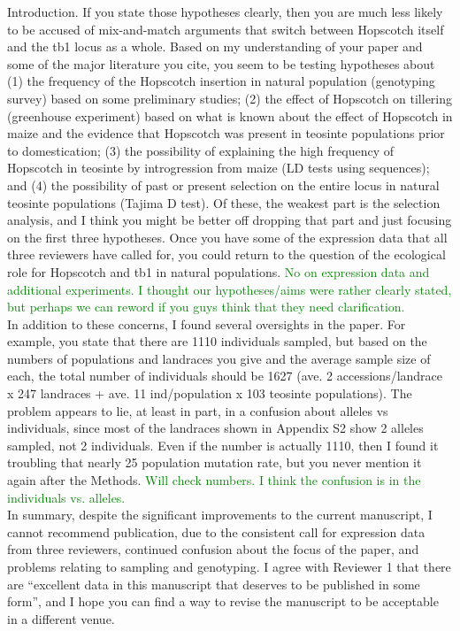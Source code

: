 \documentclass[11pt]{article}
\newcommand{\lev}[1]{\noindent \textcolor{green}{{#1}} \\}
\begin{document}
Introduction.  If you state those hypotheses clearly, then you are much less likely to be accused of mix-and-match arguments that switch between Hopscotch itself and the tb1 locus as a whole.  Based on my understanding of your paper and some of the major literature you cite, you seem to be testing hypotheses about (1) the frequency of the Hopscotch insertion in natural population (genotyping survey) based on some preliminary studies; (2) the effect of Hopscotch on tillering (greenhouse experiment) based on what is known about the effect of Hopscotch in maize and the evidence that Hopscotch was present in teosinte populations prior to domestication; (3) the possibility of explaining the high frequency of Hopscotch in teosinte by introgression from maize (LD tests using sequences); and (4) the possibility of past or present selection on the entire locus in natural teosinte populations (Tajima D test).  Of these, the weakest part is the selection analysis, and I think you might
be better off dropping that part and just focusing on the first three hypotheses.  Once you have some of the expression data that all three reviewers have called for, you could return to the question of the ecological role for Hopscotch and tb1 in natural populations.
\lev{No on expression data and additional experiments. I thought our hypotheses/aims were rather clearly stated, but perhaps we can reword if you guys think that they need clarification.}
    In addition to these concerns, I found several oversights in the paper.  For example, you state that there are 1110 individuals sampled, but based on the numbers of populations and landraces you give and the average sample size of each, the total number of individuals should be 1627 (ave. 2 accessions/landrace x 247 landraces + ave. 11 ind/population x 103 teosinte populations).  The problem appears to lie, at least in part, in a confusion about alleles vs individuals, since most of the landraces shown in Appendix S2 show 2 alleles sampled, not 2 individuals.  Even if the number is actually 1110, then I found it troubling that nearly 25%
population mutation rate, but you never mention it again after the Methods.
\lev{Will check numbers. I think the confusion is in the individuals vs. alleles.}
    In summary, despite the significant improvements to the current manuscript, I cannot recommend publication, due to the consistent call for expression data from three reviewers, continued confusion about the focus of the paper, and problems relating to sampling and genotyping.  I agree with Reviewer 1 that there are “excellent data in this manuscript that deserves to be published in some form”, and I hope you can find a way to revise the manuscript to be acceptable in a different venue.
\end{document}
